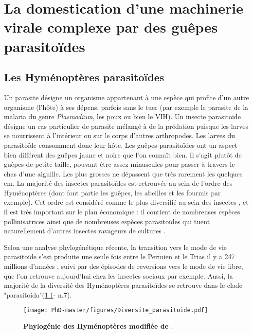\chapter{La domestication d'une machinerie virale complexe par des guêpes parasitoïdes}
{\hypersetup{linkcolor=GREYDARK}\minitoc}
\label{chap:intro-parasitoids}

\section{Les Hyménoptères parasitoïdes}

Un parasite désigne un organisme appartenant à une espèce qui profite d’un autre organisme (l'hôte) à ses dépens, parfois sans le tuer (par exemple le parasite de la malaria du genre \textit{Plasmodium}, les poux ou bien le VIH). Un insecte parasitoïde désigne un cas particulier de parasite mélangé à de la prédation puisque les larves se nourrissent à l’intérieur ou sur le corps d’autres arthropodes. Les larves du parasitoïde consomment donc leur hôte. Les guêpes parasitoïdes ont un aspect bien différent des guêpes jaune et noire que l’on connaît bien. Il s’agit plutôt de guêpes de petite taille, pouvant être assez minuscules pour passer à travers le chas d’une aiguille. Les plus grosses ne dépassent que très rarement les quelques cm. La majorité des insectes parasitoïdes est retrouvée au sein de l’ordre des Hyménoptères (dont font partie les guêpes, les abeilles et les fourmis par exemple). Cet ordre est considéré comme le plus diversifié au sein des insectes \citep{forbes_1_2018}, et il est très important sur le plan économique : il contient de nombreuses espèces pollinisatrices ainsi que de nombreuses espèces parasitoïdes qui tuent naturellement d’autres insectes ravageurs de cultures \citep{foottit_biodiversity_2009}. 

Selon une analyse phylogénétique récente, la transition vers le mode de vie parasitoïde s'est produite une seule fois entre le Permien et le Trias il y a 247 millions d'années \citep{peters_evolutionary_2017}, suivi par des épisodes de reversions vers le mode de vie libre, que l'on retrouve aujourd'hui chez les insectes sociaux par exemple. Aussi, la majorité de la diversité des Hyménoptères parasitoïdes se retrouve dans le clade "parasitoida"\citep{peters_evolutionary_2017}(\figurename{\ref{figure:diversite-parasitoid}}- n.7).\\

\begin{figure}[!htpbt]
\captionsetup{font=footnotesize}
 \centering
  \texttt{[image: PhD-master/figures/Diversite\_parasitoide.pdf]}
\caption[Intro:Phylogénie des Hyménoptères]{\textbf{Phylogénie des Hyménoptères modifiée de \cite{peters_evolutionary_2017}}.}
\label{figure:diversite-parasitoid}
\end{figure}

